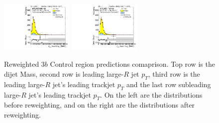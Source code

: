 \begin{figure}[htbp!]
\begin{center}
\includegraphics[angle=270, width=0.31\textwidth]{./figures/boosted/Prereweight/Moriond_ThreeTag_Control_sublHCand_trk0_Pt.pdf}
\includegraphics[angle=270, width=0.31\textwidth]{./figures/boosted/Control/b77_ThreeTag_Control_sublHCand_trk0_Pt.pdf}\\
\caption{Reweighted 3$b$ Control region predictions comaprison. Top row is the dijet Mass, second row is leading large-$R$ jet $p_{T}$, third row is the leading large-$R$ jet's leading trackjet $p_T$ and the last row subleading large-$R$ jet's leading trackjet $p_T$. On the left are the distributions before reweighting, and on the right are the distributions after reweighting.}
\label{fig:rw-3b-comp-cr}
\end{center}
\end{figure}



